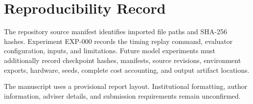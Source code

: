 \documentclass[12pt,a4paper,oneside]{report}
\begin{document}
\chapter{Reproducibility Record}
The repository source manifest identifies imported file paths and SHA-256 hashes. Experiment EXP-000 records the timing replay command, evaluator configuration, inputs, and limitations. Future model experiments must additionally record checkpoint hashes, manifests, source revisions, environment exports, hardware, seeds, complete cost accounting, and output artifact locations.

The manuscript uses a provisional report layout. Institutional formatting, author information, adviser details, and submission requirements remain unconfirmed.
\end{document}

